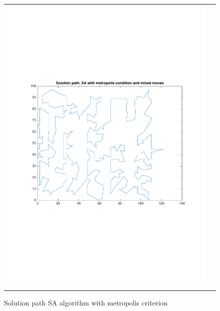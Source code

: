 \documentclass[a4paper, 11pt]{scrartcl}
\begin{document}
\begin{figure}[!ht]
\begin{tabular}{cc}
    \includegraphics[scale=0.4, trim={3cm 6cm 1cm 6cm}]{../figures/solutionPath_SA_metropolis_mixed.pdf}
  \end{tabular}
  \caption{Solution path SA algorithm with metropolis criterion}
  \label{fig:solpath-SA-metropolis}
\end{figure}
\end{document}
